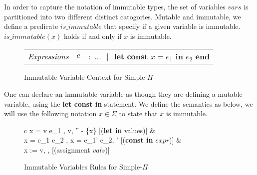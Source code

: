 \documentclass[a4paper,12pt]{report}
\begin{document}
\par
In order to capture the notation of immutable types, the set of variables $vars$ 
is partitioned into two different distinct catogories. Mutable and immutable, we 
define a predicate $is\_immutable$ that specify if a given variable is immutable. 
$is\_immutable(x)$ holds if and only if $x$ is immutable. 

\begin{figure}[H]
  \begin{center}
    \begin{tabular} {l l l}
      \textit{Expressions} & $e$& $:$ $...\text{ }|\text{ }
        \textbf{let const }x = e_1 \textbf{ in }e_2\textbf{ end}$
    \end{tabular}
  \end{center}
  \caption{Immutable Variable Context for Simple-$\Pi$}
\end{figure}
 
One can declare an immutable variable as though they are defining a mutable 
variable, using the \textbf{let const in} statement. We define the semantics as 
below, we will use the following notation $x \in \Sigma$ to state that $x$ is 
immutable.

\begin{figure}[H]
  \begin{center}
    \begin{tabular}{c}
      {\langle {}x = v  e_1 , \sigma \rangle 
      \longrightarrow \langle v, \sigma'' - \{x\} \rangle} [(\textbf{let in} values)] 
      & \\
      {\langle {}x = e_1  e_2 , \sigma \rangle 
      \longrightarrow \langle {}x = e_1'  e_2, \sigma' \rangle} 
      [(\textbf{const in} $expr$)]
      & \\
      {\langle x := v, \sigma \rangle \longrightarrow \langle {}, \sigma[x \mapsto v] \rangle} [(assignment $vals$)] \text{ }
    \end{tabular}
  \end{center}
  \caption{Immutable Variables Rules for Simple-$\Pi$}
\end{figure}
\end{document}
